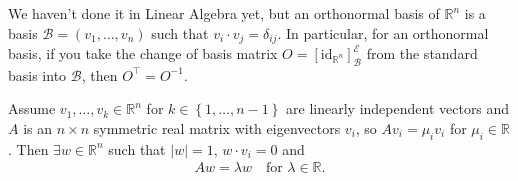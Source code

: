 
\begin{remark}
	We haven't done it in Linear Algebra yet, but an orthonormal basis of $\mathbb{R}^{n}$ is a basis $\mathcal{B} = (v_{1}, \dots, v_{n})$ such that $v_{i} \cdot v_{j} = \delta_{ij}$. In particular, for an orthonormal basis, if you take the change of basis matrix $O = [\text{id}_{\mathbb{R}^{n}}]^{\mathcal{E}}_{\mathcal{B}}$ from the standard basis into $\mathcal{B}$, then $O^\top = O^{-1}$.
\end{remark}

\begin{lemma}\label{lem:eig-min}
	Assume $v_{1}, \dots, v_{k} \in \mathbb{R}^{n}$ for $k \in \left\{ 1, \dots, n-1 \right\}$ are linearly independent vectors and $A$ is an $n \times n$ symmetric real matrix with eigenvectors $v_{i}$, so $A v_{i} = \mu_{i} v_{i}$ for $\mu_{i} \in \mathbb{R}$. Then $\exists w \in \mathbb{R}^{n}$ such that $\left| w \right| = 1$, $w \cdot v_{i} = 0$ and
	\begin{align*}
		Aw = \lambda w \quad \text{for } \lambda \in \mathbb{R}.
	\end{align*}
\end{lemma}
